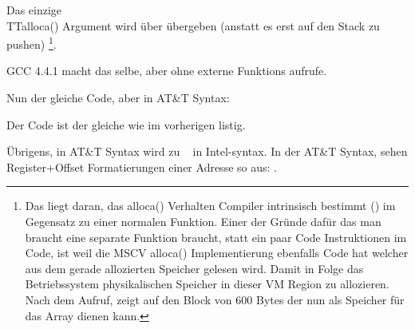 Das einzige \\TT{alloca()} Argument wird über \EAX übergeben (anstatt es erst auf den Stack zu pushen)
\footnote{Das liegt daran, das alloca() Verhalten Compiler intrinsisch bestimmt () im Gegensatz zu einer normalen Funktion. Einer der Gründe dafür das man braucht eine separate Funktion braucht, statt ein paar Code Instruktionen im Code,  ist weil die \ac{MSCV} alloca() Implementierung ebenfalls Code hat welcher aus dem gerade allozierten Speicher gelesen wird. Damit in Folge das \ac{Betriebssystem} physikalischen Speicher in dieser \ac{VM} Region zu allozieren. Nach dem  Aufruf, zeigt \ESP auf den Block von 600 Bytes der nun als Speicher für das  Array dienen kann.}.


GCC 4.4.1 macht das selbe, aber ohne externe Funktions aufrufe.




Nun der gleiche Code, aber in AT\&T Syntax:



\myindex{\ATTSyntax}
Der Code ist der gleiche wie im vorherigen listig.

Übrigens,  in AT\&T Syntax wird zu \
 in Intel-syntax.
In der AT\&T Syntax, sehen Register+Offset Formatierungen einer Adresse so aus:
\TT{offset(\%{register})}.
